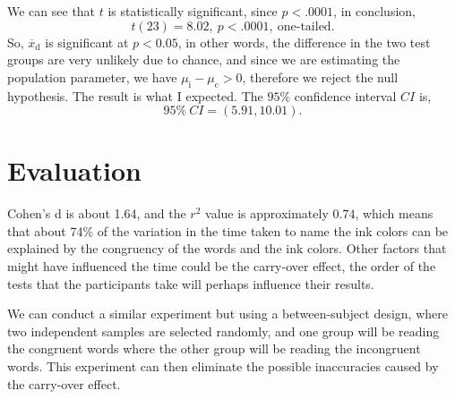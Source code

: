 \documentclass[12pt,titlepage]{article}
\begin{document}
  We can see that $t$ is statistically significant, since $p < .0001$, in conclusion,
  $$ t(23) = 8.02,\ p < .0001,\ \textrm{one-tailed}. $$
  So, $\overline{x}_\mathrm{d}$ is significant at $p<0.05$, in other words, the difference in the two test groups are very unlikely due to chance, and since we are estimating the population parameter, we have $\mu_\mathrm{i} - \mu_\mathrm{c} > 0$, therefore we reject the null hypothesis. The result is what I expected.
  The $95\%$ confidence interval $CI$ is,
  $$ 95\%\ CI = (5.91, 10.01). $$


\section{Evaluation}
  Cohen's d is about 1.64, and the $r^2$ value is approximately $0.74$, which means that about 74\% of the variation in the time taken to name the ink colors can be explained by the congruency of the words and the ink colors. Other factors that might have influenced the time could be the carry-over effect, the order of the tests that the participants take will perhaps influence their results.
  
  We can conduct a similar experiment but using a between-subject design, where two independent samples are selected randomly, and one group will be reading the congruent words where the other group will be reading the incongruent words. This experiment can then eliminate the possible inaccuracies caused by the carry-over effect.


\medskip
 


\end{document}
